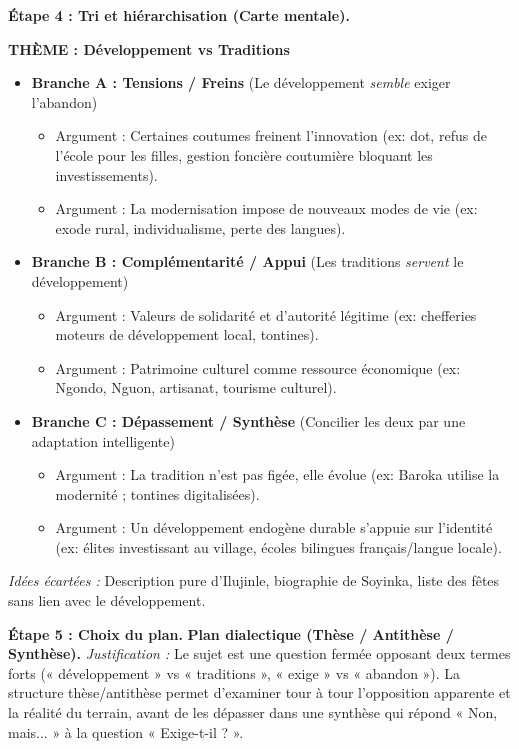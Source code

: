 \documentclass[11pt]{article}
\begin{document}
\begin{exoresolu}
\textbf{Étape 4 : Tri et hiérarchisation (Carte mentale).}
\begin{center}
\textbf{THÈME : Développement vs Traditions}
\end{center}
\begin{itemize}
\item \textbf{Branche A : Tensions / Freins} (Le développement \emph{semble} exiger l'abandon)
  \begin{itemize}
  \item Argument : Certaines coutumes freinent l'innovation (ex: dot, refus de l'école pour les filles, gestion foncière coutumière bloquant les investissements).
  \item Argument : La modernisation impose de nouveaux modes de vie (ex: exode rural, individualisme, perte des langues).
  \end{itemize}
\item \textbf{Branche B : Complémentarité / Appui} (Les traditions \emph{servent} le développement)
  \begin{itemize}
  \item Argument : Valeurs de solidarité et d'autorité légitime (ex: chefferies moteurs de développement local, tontines).
  \item Argument : Patrimoine culturel comme ressource économique (ex: Ngondo, Nguon, artisanat, tourisme culturel).
  \end{itemize}
\item \textbf{Branche C : Dépassement / Synthèse} (Concilier les deux par une adaptation intelligente)
  \begin{itemize}
  \item Argument : La tradition n'est pas figée, elle évolue (ex: Baroka utilise la modernité ; tontines digitalisées).
  \item Argument : Un développement endogène durable s'appuie sur l'identité (ex: élites investissant au village, écoles bilingues français/langue locale).
  \end{itemize}
\end{itemize}
\textit{Idées écartées :} Description pure d'Ilujinle, biographie de Soyinka, liste des fêtes sans lien avec le développement.

\textbf{Étape 5 : Choix du plan.}
\textbf{Plan dialectique (Thèse / Antithèse / Synthèse).}
\textit{Justification :} Le sujet est une question fermée opposant deux termes forts (« développement » vs « traditions », « exige » vs « abandon »). La structure thèse/antithèse permet d'examiner tour à tour l'opposition apparente et la réalité du terrain, avant de les dépasser dans une synthèse qui répond « Non, mais... » à la question « Exige-t-il ? ».


\end{exoresolu}
\end{document}
